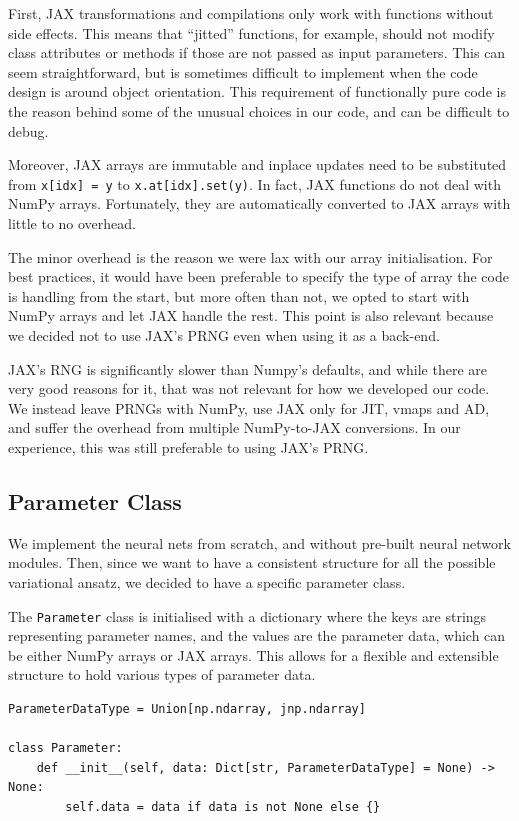 First, JAX transformations and compilations only work with functions without side effects. This means that ``jitted'' functions, for example, should not modify class attributes or methods if those are not passed as input parameters. This can seem straightforward, but is sometimes difficult to implement when the code design is around object orientation. This requirement of functionally pure code is the reason behind some of the unusual choices in our code, and can be difficult to debug.

Moreover, JAX arrays are immutable and inplace updates need to be substituted from \verb|x[idx] = y| to \verb|x.at[idx].set(y)|. In fact, JAX functions do not deal with NumPy arrays. Fortunately, they are automatically converted to JAX arrays with little to no overhead. 

The minor overhead is the reason we were lax with our array initialisation. For best practices, it would have been preferable to specify the type of array the code is handling from the start, but more often than not, we opted to start with NumPy arrays and let JAX handle the rest. This point is also relevant because we decided not to use JAX's PRNG even when using it as a back-end. 

JAX's RNG is significantly slower than Numpy's defaults, and while there are very good reasons for it, that was not relevant for how we developed our code. We instead leave PRNGs with NumPy, use JAX only for JIT, vmaps and AD, and suffer the overhead from multiple NumPy-to-JAX conversions. In our experience, this was still preferable to using JAX's PRNG.


\subsection{Parameter Class}

We implement the neural nets from scratch, and without pre-built neural network modules. Then, since we want to have a consistent structure for all the possible variational ansatz, we decided to have a specific parameter class.

The \verb|Parameter| class is initialised with a dictionary where the keys are strings representing parameter names, and the values are the parameter data, which can be either NumPy arrays or JAX arrays. This allows for a flexible and extensible structure to hold various types of parameter data.

\begin{lstlisting}
ParameterDataType = Union[np.ndarray, jnp.ndarray]

class Parameter:
    def __init__(self, data: Dict[str, ParameterDataType] = None) -> None:
        self.data = data if data is not None else {}

\end{lstlisting}

